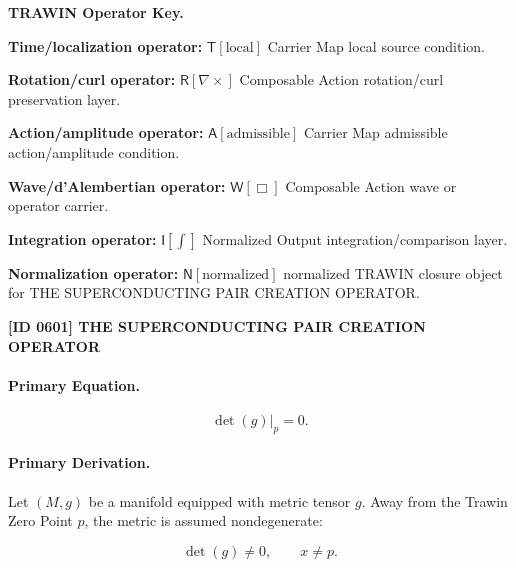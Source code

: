 \par\vspace{0.45\baselineskip}
\noindent\begin{minipage}[t]{\linewidth}
\begingroup
\small
\raggedright
\textbf{TRAWIN Operator Key.}\par
\noindent\textbf{Time/localization operator:} $\mathsf{T}\!\left[\mathrm{local}\right]$ Carrier Map local source condition.\par
\noindent\textbf{Rotation/curl operator:} $\mathsf{R}\!\left[\nabla\times\right]$ Composable Action rotation/curl preservation layer.\par
\noindent\textbf{Action/amplitude operator:} $\mathsf{A}\!\left[\mathrm{admissible}\right]$ Carrier Map admissible action/amplitude condition.\par
\noindent\textbf{Wave/d'Alembertian operator:} $\mathsf{W}\!\left[\Box\right]$ Composable Action wave or operator carrier.\par
\noindent\textbf{Integration operator:} $\mathsf{I}\!\left[\int\right]$ Normalized Output integration/comparison layer.\par
\noindent\textbf{Normalization operator:} $\mathsf{N}\!\left[\mathrm{normalized}\right]$ normalized TRAWIN closure object for THE SUPERCONDUCTING PAIR CREATION OPERATOR.\par
\endgroup
\end{minipage}

\clearpage
\noindent\textbf{[ID 0601] THE SUPERCONDUCTING PAIR CREATION OPERATOR}\par
\vspace{0.35em}
\paragraph{Primary Equation.}
\begin{equation}
\det(g)\big|_{p}=0 .
\end{equation}

\paragraph{Primary Derivation.}
Let $(M,g)$ be a manifold equipped with metric tensor $g$. Away from the Trawin Zero Point $p$, the metric is assumed nondegenerate:

\begin{equation}
\det(g)\neq 0,
\qquad x\neq p .
\end{equation}

